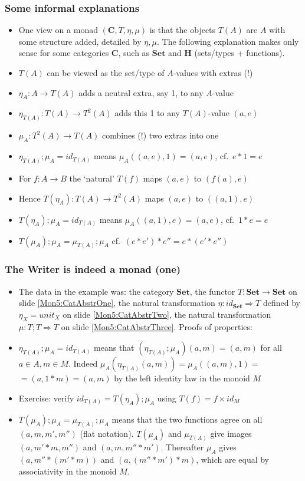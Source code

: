 \documentclass[handout]{beamer}
\newcommand{\To}{\Rightarrow}
\newcommand{\bfsf}[1]{{\boldsymbol{#1}}}
\newcommand{\Set}{\bfsf{Set}}
\newcommand{\CC}{\bfsf{C}}
\newcommand{\HH}{\bfsf{H}}
\begin{document}
\frame
  {   
    \frametitle{Some informal explanations}\label{Mon5:InfoMonad}

 \begin{itemize}[<+->]
\item One view on a monad $(\CC,T,\eta,\mu)$ is that the objects $T(A)$ are $A$
with some structure added, detailed by $\eta,\mu$. The following explanation
makes only sense for some categories $\CC$, such as $\Set$ and $\HH$ 
(sets/types + functions).
\item $T(A)$ can be viewed as the set/type of $A$-values with {\color{red}extras (!)}
\item $\eta_A : A\to T(A)$ adds a neutral extra, say 1, to any $A$-value
\item $\eta_{T(A)} : T(A)\to T^2(A)$ adds this 1 to any $T(A)$-value $(a,e)$
\item $\mu_A: T^2(A)\to T(A)$ {\color{red}combines (!)} two extras into one
\item $\eta_{T(A)};\mu_A = id_{T(A)}$ means $\mu_A((a,e),1) = (a,e)$, cf.\ $e*1=e$
\item For $f:A\to B$ the `natural' $T(f)$ maps $(a,e)$ to $(f(a),e)$
\item Hence $T(\eta_A) : T(A)\to T^2(A)$ maps $(a,e)$ to $((a,1),e)$
\item $T(\eta_A);\mu_A=id_{T(A)}$ means $\mu_A((a,1),e) = (a,e)$, cf.\ $1*e=e$
\item $T(\mu_A);\mu_A = \mu_{T(A)};\mu_A$ cf.\ $(e*e')*e'' = e*(e'*e'')$
 \end{itemize}

 }


\frame
  {   
    \frametitle{The Writer is indeed a monad (one)}\label{Mon5:ExaMonadOne}

 \begin{itemize}[<+->]
\item The data in the example was: the category $\Set$, 
the functor $T:\Set\to\Set$ on slide \ref{Mon5:CatAbstrOne}, 
the natural transformation $\eta: id_\Set\To T$
defined by $\eta_X = unit_X$ on slide \ref{Mon5:CatAbstrTwo}, 
the natural transformation $\mu: T;T \To T$
on slide \ref{Mon5:CatAbstrThree}. Proofs of properties:
\item $\eta_{T(A)};\mu_A = id_{T(A)}$ means that  $(\eta_{T(A)};\mu_A)(a,m) = (a,m)$
for all $a\in A, m\in M$. Indeed $\mu_A(\eta_{T(A)}(a,m)) = \mu_A((a,m),1) =$ $= (a,1*m) = (a,m)$
by the left identity law in the monoid $M$
\item Exercise: verify  $id_{T(A)} = T(\eta_A);\mu_A$ using $T(f) = f\times id_M$
\item $T(\mu_A);\mu_A = \mu_{T(A)};\mu_A$ means that the two functions agree
on all $(a,m,m',m'')$ (flat notation). $T(\mu_A)$ and $\mu_{T(A)}$ give images $(a,m'*m,m'')$ and $(a,m,m''*m')$. Thereafter $\mu_A$ gives $(a,m''*(m'*m))$ and $(a,(m''*m')*m)$, which are equal by associativity in the monoid $M$.
 \end{itemize}

 }
\end{document}
